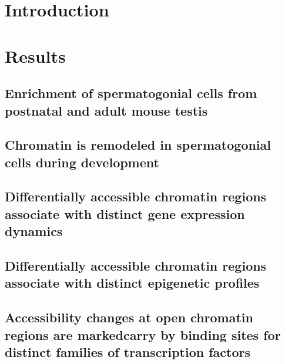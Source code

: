 \documentclass[12pt,twoside]{reedthesis}
\begin{document}
\newpage

\hypertarget{introduction}{%
\section{Introduction}\label{introduction}}

\newpage

\hypertarget{results}{%
\section{Results}\label{results}}

\hypertarget{enrichment-of-spermatogonial-cells-from-postnatal-and-adult-mouse-testis}{%
\subsection{Enrichment of spermatogonial cells from postnatal and adult mouse testis}\label{enrichment-of-spermatogonial-cells-from-postnatal-and-adult-mouse-testis}}

\hypertarget{chromatin-is-remodeled-in-spermatogonial-cells-during-development}{%
\subsection{Chromatin is remodeled in spermatogonial cells during development}\label{chromatin-is-remodeled-in-spermatogonial-cells-during-development}}

\hypertarget{differentially-accessible-chromatin-regions-associate-with-distinct-gene-expression-dynamics}{%
\subsection{Differentially accessible chromatin regions associate with distinct gene expression dynamics}\label{differentially-accessible-chromatin-regions-associate-with-distinct-gene-expression-dynamics}}

\hypertarget{differentially-accessible-chromatin-regions-associate-with-distinct-epigenetic-profiles}{%
\subsection{Differentially accessible chromatin regions associate with distinct epigenetic profiles}\label{differentially-accessible-chromatin-regions-associate-with-distinct-epigenetic-profiles}}

\hypertarget{accessibility-changes-at-open-chromatin-regions-are-markedcarry-by-binding-sites-for-distinct-families-of-transcription-factors}{%
\subsection{Accessibility changes at open chromatin regions are markedcarry by binding sites for distinct families of transcription factors}\label{accessibility-changes-at-open-chromatin-regions-are-markedcarry-by-binding-sites-for-distinct-families-of-transcription-factors}}
\end{document}
